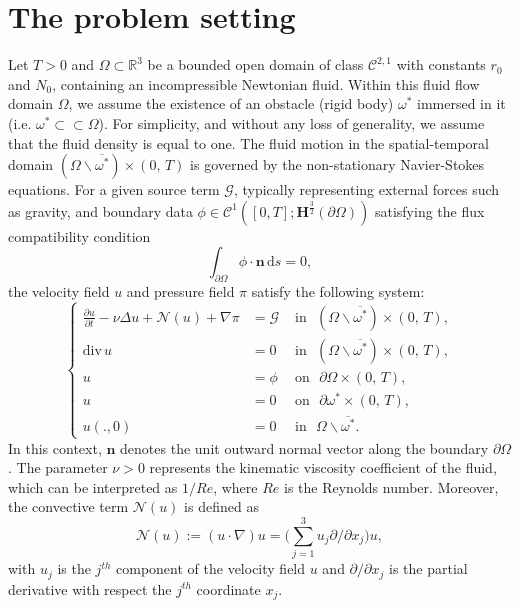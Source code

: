 \documentclass[a4paper,12pt,reqno,natbib]{amsart}
\newcommand{\ds} {\displaystyle\mathrm{d}s}
\def\N{\mathcal N}
\def\H{\textbf{H}}
\begin{document}
\section{The problem setting} \label{sec:problem-setting}
 Let $T>0$ and $\Omega\subset\mathbb{R}^3$ be a bounded open domain of class $\mathcal{C}^{2,1}$ with constants $r_0$ and $N_0$, containing an incompressible Newtonian fluid. Within this fluid flow domain $\Omega$, we assume the existence of an obstacle (rigid body) $\omega^*$ immersed in it (i.e. $\omega^*\subset\subset\Omega$). For simplicity, and without any loss of generality, we assume that the fluid density is equal to one. The fluid motion in the spatial-temporal domain $(\Omega\backslash\overline{\omega^*})\times (0,\,T)$ is governed by the non-stationary Navier-Stokes equations. For a given source term \(\mathcal{G}\), typically representing external forces such as gravity, and boundary data \(\phi \in \mathcal{C}^1([0,T]; \H^{\frac{3}{2}}(\partial \Omega))\) satisfying the flux compatibility condition
 \begin{equation}\label{condition-normalization}
    \displaystyle\int_{\partial\Omega}\phi\cdot\textbf{n}\,\ds=0,
  \end{equation}  
    the velocity field $u$ and pressure field $\pi$ satisfy the following system:
\begin{equation}\label{direct-problem}
\left\{
\begin{array}{rll}
\displaystyle \frac {\partial u}{\partial t}-\nu
\Delta u+ \N(u)+ \nabla \pi
 &= \mathcal{G} &\mbox{ in }  \,\,(\Omega\backslash\overline{\omega^*})\times (0,\,T) ,\\
\mbox{div}\, u &=  0 & \mbox{ in } \,\, (\Omega\backslash\overline{\omega^*}) \times (0,\,T) ,\\
u &= \phi & \mbox{ on }\,\,  \partial\Omega \times (0,\,T) , \\
u &=  0 & \mbox{ on } \,\, \partial\omega^* \times (0,\,T) ,\\
u(.,0)&= 0&\mbox{ in } \,\,  \Omega\backslash\overline{\omega^*}.
\end{array}
 \right.
\end{equation}
In this context, \( \mathbf{n} \) denotes the unit outward normal vector along the boundary \( \partial \Omega \). The parameter \( \nu > 0 \) represents the kinematic viscosity coefficient of the fluid, which can be interpreted as \( 1/Re \), where \( Re \) is the Reynolds number. Moreover, the convective term \( \mathcal{N}(u) \) is defined as
$$
\N(u):=(u\cdot\nabla)u=\big(\sum_{j=1}^{3}u_j {\partial}/{\partial x_j}\big)u,
$$
with $u_j$ is the $j^{th}$ component of the velocity field $u$ and ${\partial}/{\partial x_j}$ is the partial derivative with respect the $j^{th}$ coordinate $x_j$.
\end{document}
